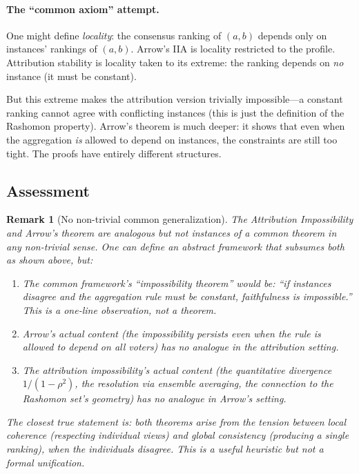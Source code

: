 \documentclass{article}
\newtheorem{remark}[theorem]{Remark}
\begin{document}
\paragraph{The ``common axiom'' attempt.}
One might define \emph{locality}: the consensus ranking of $(a,b)$
depends only on instances' rankings of $(a,b)$. Arrow's IIA is
locality restricted to the profile. Attribution stability is locality
taken to its extreme: the ranking depends on \emph{no} instance
(it must be constant).

But this extreme makes the attribution version trivially
impossible---a constant ranking cannot agree with conflicting
instances (this is just the definition of the Rashomon property).
Arrow's theorem is much deeper: it shows that even when the
aggregation \emph{is} allowed to depend on instances, the constraints
are still too tight. The proofs have entirely different structures.

\subsection{Assessment}

\begin{remark}[No non-trivial common generalization]
\label{rem:no-arrow-unification}
The Attribution Impossibility and Arrow's theorem are \emph{analogous}
but not \emph{instances of a common theorem} in any non-trivial sense.
One can define an abstract framework that subsumes both as shown above,
but:
\begin{enumerate}
    \item The common framework's ``impossibility theorem'' would be:
      ``if instances disagree and the aggregation rule must be constant,
      faithfulness is impossible.'' This is a one-line observation,
      not a theorem.
    \item Arrow's actual content (the impossibility persists even when
      the rule \emph{is} allowed to depend on all voters) has no
      analogue in the attribution setting.
    \item The attribution impossibility's actual content (the
      quantitative divergence $1/(1-\rho^2)$, the resolution via
      ensemble averaging, the connection to the Rashomon set's geometry)
      has no analogue in Arrow's setting.
\end{enumerate}
The closest true statement is: \emph{both theorems arise from the
tension between local coherence (respecting individual views) and
global consistency (producing a single ranking), when the individuals
disagree}. This is a useful heuristic but not a formal unification.
\end{remark}
\end{document}

